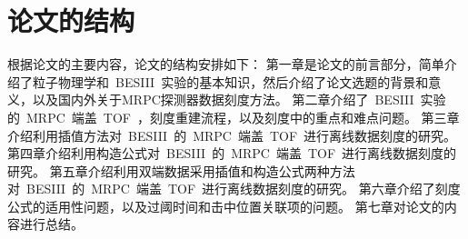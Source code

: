 \section{论文的结构}
根据论文的主要内容，论文的结构安排如下：
第一章是论文的前言部分，简单介绍了粒子物理学和~BESIII~实验的基本知识，然后介绍了论文选题的背景和意义，以及国内外关于MRPC探测器数据刻度方法。
第二章介绍了~BESIII~实验的~MRPC~端盖~TOF~，刻度重建流程，以及刻度中的重点和难点问题。
第三章介绍利用插值方法对~BESIII~的~MRPC~端盖~TOF~进行离线数据刻度的研究。
第四章介绍利用构造公式对~BESIII~的~MRPC~端盖~TOF~进行离线数据刻度的研究。
第五章介绍利用双端数据采用插值和构造公式两种方法对~BESIII~的~MRPC~端盖~TOF~进行离线数据刻度的研究。
第六章介绍了刻度公式的适用性问题，以及过阈时间和击中位置关联项的问题。
第七章对论文的内容进行总结。











